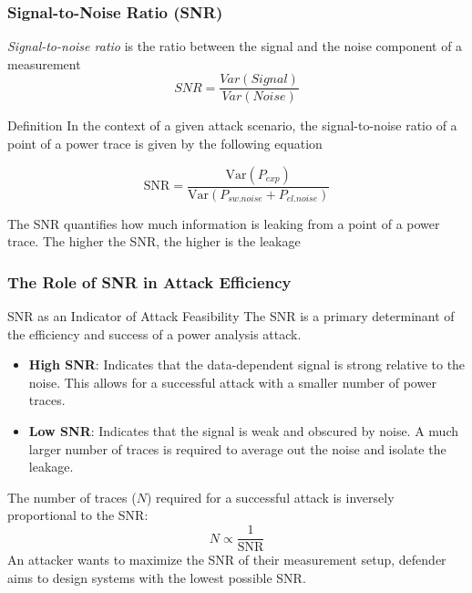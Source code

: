 \begin{frame}
    \frametitle{Signal-to-Noise Ratio (SNR)}

        \textit{Signal-to-noise ratio} is the ratio between the signal and the noise component of a measurement $$SNR=\frac{Var(Signal)}{Var(Noise)}$$
    \begin{block}{Definition}
        In the context of a given attack scenario, the signal-to-noise ratio of a point of a power trace is given by the following equation
        
        \vspace{0.5cm}
        $$ \text{SNR} = \frac{\text{Var}(P_{exp})}{\text{Var}(P_{sw.noise}+P_{el.noise})} $$
        \vspace{0.5cm}
        
        The SNR quantifies how much information is leaking from a point of a power trace. The higher the SNR, the higher is the leakage
    \end{block}
\end{frame}

\begin{frame}
    \frametitle{The Role of SNR in Attack Efficiency}

    \begin{block}{SNR as an Indicator of Attack Feasibility}
        The SNR is a primary determinant of the efficiency and success of a power analysis attack.
        
        \begin{itemize}
            \item \textbf{High SNR}: Indicates that the data-dependent signal is strong relative to the noise. This allows for a successful attack with a smaller number of power traces.
            \item \textbf{Low SNR}: Indicates that the signal is weak and obscured by noise. A much larger number of traces is required to average out the noise and isolate the leakage.
        \end{itemize}
    \end{block}
    
        The number of traces ($N$) required for a successful attack is inversely proportional to the SNR:
        $$ N \propto \frac{1}{\text{SNR}} $$
        An attacker wants to maximize the SNR of their measurement setup, defender aims to design systems with the lowest possible SNR.
\end{frame}
